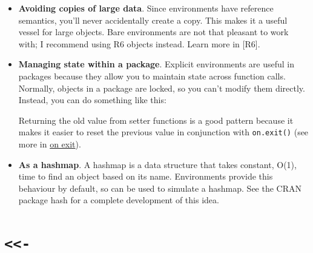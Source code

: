 \documentclass[]{book}
\newenvironment{Shaded}{\begin{snugshade}}{\end{snugshade}}
\newcommand{\ControlFlowTok}[1]{\textcolor[rgb]{0.13,0.29,0.53}{\textbf{#1}}}
\newcommand{\DataTypeTok}[1]{\textcolor[rgb]{0.13,0.29,0.53}{#1}}
\newcommand{\DecValTok}[1]{\textcolor[rgb]{0.00,0.00,0.81}{#1}}
\newcommand{\KeywordTok}[1]{\textcolor[rgb]{0.13,0.29,0.53}{\textbf{#1}}}
\newcommand{\NormalTok}[1]{#1}
\newcommand{\OperatorTok}[1]{\textcolor[rgb]{0.81,0.36,0.00}{\textbf{#1}}}
\newcommand{\StringTok}[1]{\textcolor[rgb]{0.31,0.60,0.02}{#1}}
\theoremstyle{definition}
\theoremstyle{definition}
\theoremstyle{definition}
\theoremstyle{remark}
\begin{document}
\begin{itemize}
\item
  \textbf{Avoiding copies of large data}. Since environments have
  reference semantics, you'll never accidentally create a copy. This
  makes it a useful vessel for large objects. Bare environments are not
  that pleasant to work with; I recommend using R6 objects instead.
  Learn more in {[}R6{]}.
\item
  \textbf{Managing state within a package}. Explicit environments are
  useful in packages because they allow you to maintain state across
  function calls. Normally, objects in a package are locked, so you
  can't modify them directly. Instead, you can do something like this:

\begin{Shaded}
\end{Shaded}

  Returning the old value from setter functions is a good pattern
  because it makes it easier to reset the previous value in conjunction
  with \texttt{on.exit()} (see more in \protect\hyperlink{on-exit}{on
  exit}).
\item
  \textbf{As a hashmap}. A hashmap is a data structure that takes
  constant, O(1), time to find an object based on its name. Environments
  provide this behaviour by default, so can be used to simulate a
  hashmap. See the CRAN package hash for a complete development of this
  idea.
\end{itemize}

\hypertarget{section}{%
\section{\texorpdfstring{\texttt{\textless{}\textless{}-}}{\textless{}\textless{}-}}\label{section}}
\end{document}
